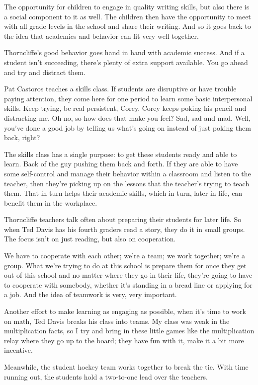 The opportunity for children to engage in quality writing skills, but also there is a social component to it as well. The children then have the opportunity to meet with all grade levels in the school and share their writing. And so it goes back to the idea that academics and behavior can fit very well together.

Thorncliffe's good behavior goes hand in hand with academic success. And if a student isn't succeeding, there's plenty of extra support available. You go ahead and try and distract them.

Pat Castoros teaches a skills class. If students are disruptive or have trouble paying attention, they come here for one period to learn some basic interpersonal skills. Keep trying, be real persistent, Corey. Corey keeps poking his pencil and distracting me. Oh no, so how does that make you feel? Sad, sad and mad. Well, you've done a good job by telling us what's going on instead of just poking them back, right?

The skills class has a single purpose: to get these students ready and able to learn. Back of the guy pushing them back and forth. If they are able to have some self-control and manage their behavior within a classroom and listen to the teacher, then they're picking up on the lessons that the teacher's trying to teach them. That in turn helps their academic skills, which in turn, later in life, can benefit them in the workplace.

Thorncliffe teachers talk often about preparing their students for later life. So when Ted Davis has his fourth graders read a story, they do it in small groups. The focus isn't on just reading, but also on cooperation.

We have to cooperate with each other; we're a team; we work together; we're a group. What we're trying to do at this school is prepare them for once they get out of this school and no matter where they go in their life, they're going to have to cooperate with somebody, whether it's standing in a bread line or applying for a job. And the idea of teamwork is very, very important.

Another effort to make learning as engaging as possible, when it's time to work on math, Ted Davis breaks his class into teams. My class was weak in the multiplication facts, so I try and bring in these little games like the multiplication relay where they go up to the board; they have fun with it, make it a bit more incentive.

Meanwhile, the student hockey team works together to break the tie. With time running out, the students hold a two-to-one lead over the teachers.

